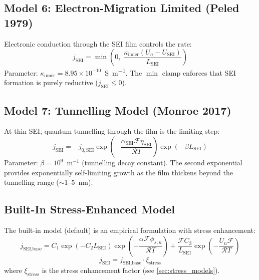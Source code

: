 \subsection{Model 6: Electron-Migration Limited (Peled 1979)~\cite{Peled1979}}

Electronic conduction through the SEI film controls the rate:
\begin{equation}
  j_\text{SEI} = \min\!\left(0,\; \frac{\kappa_\text{inner}(U_n - U_\text{SEI})}{L_\text{SEI}}\right)
  \label{eq:sei_electron}
\end{equation}
Parameter: $\kappa_\text{inner} = 8.95\times10^{-10}$~\si{\siemens\per\meter}. The $\min$ clamp enforces that SEI formation is purely reductive ($j_\text{SEI} \leq 0$).

\subsection{Model 7: Tunnelling Model (Monroe 2017)~\cite{Monroe2017}}

At thin SEI, quantum tunnelling through the film is the limiting step:
\begin{equation}
  j_\text{SEI} = -j_{0,\text{SEI}} \exp\!\left(-\frac{\alpha_\text{SEI}\mathcal{F}\eta_\text{SEI}}{\mathcal{R}T}\right) \exp(-\beta L_\text{SEI})
  \label{eq:sei_tunnelling}
\end{equation}
Parameter: $\beta = 10^9$~m$^{-1}$ (tunnelling decay constant). The second exponential provides exponentially self-limiting growth as the film thickens beyond the tunnelling range ($\sim$1--5~nm).

\subsection{Built-In Stress-Enhanced Model}

The built-in model (default) is an empirical formulation with stress enhancement:
\begin{equation}
  j_\text{SEI,base} = C_1 \exp(-C_2 L_\text{SEI}) \exp\!\left(-\frac{\alpha \mathcal{F} \phi_{s,n}}{\mathcal{R}T}\right) + \frac{\mathcal{F} C_3}{L_\text{SEI}} \exp\!\left(-\frac{U_n \mathcal{F}}{\mathcal{R}T}\right)
  \label{eq:sei_builtin}
\end{equation}
\begin{equation}
  j_\text{SEI} = j_\text{SEI,base} \cdot \xi_\text{stress}
  \label{eq:sei_builtin_enhanced}
\end{equation}
where $\xi_\text{stress}$ is the stress enhancement factor (see \cref{sec:stress_models}).

